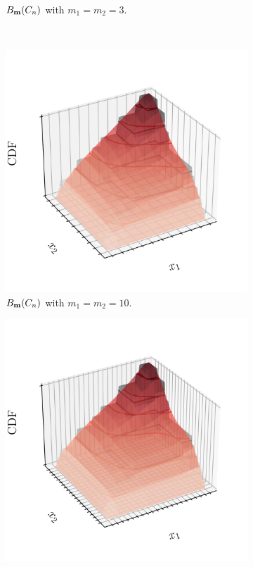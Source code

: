 \begin{figure}
\begin{subfigure}[b]{0.49\textwidth}
        \caption{$B_{{\bf m}}(C_n)$ with $m_1=m_2=3$.}
    \end{subfigure}
    \\
    \begin{subfigure}[b]{0.49\textwidth}
        \centering
        \includegraphics[width=\linewidth]{../numerical_experiments/chapter3/figures/ebc_m10.png}
        \caption{$B_{{\bf m}}(C_n)$ with $m_1=m_2=10$.}
    \end{subfigure}
    \begin{subfigure}[b]{0.49\textwidth}
        \centering
        \includegraphics[width=\linewidth]{../numerical_experiments/chapter3/figures/ebc_m20.png}

\end{subfigure}
\end{figure}
